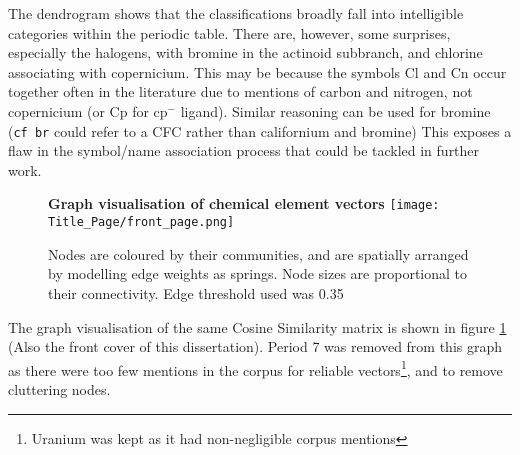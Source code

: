 The dendrogram shows that the classifications broadly fall into intelligible categories within the periodic table. There are, however, some surprises, especially the halogens, with bromine in  the actinoid subbranch, and chlorine associating with copernicium. This may be because the symbols Cl and Cn occur together often in the literature due to mentions of carbon and nitrogen, not copernicium (or Cp for cp$^{-}$ ligand). Similar reasoning can be used for bromine (\texttt{cf br} could refer to a CFC rather than californium and bromine) This exposes a flaw in the symbol/name association process that could be tackled in further work.

\newpage
\addtocounter{page}{1}
\begin{center}
\begin{figure}[H]
  \centering
  \textbf{Graph visualisation of chemical element vectors}
    \texttt{[image: Title\_Page/front\_page.png]}
    \caption[Graph Visualisation of Chemical Element Vectors]{Nodes are coloured by their communities, and are spatially arranged by modelling edge weights as springs. Node sizes are proportional to their connectivity. Edge threshold used was 0.35 }
    \label{fig:elems_graph}
\end{figure} 
\end{center}
\newpage
The graph visualisation of the same Cosine Similarity matrix is shown in figure \ref{fig:elems_graph} (Also the front cover of this dissertation). Period 7 was removed from this graph as there were too few mentions in the corpus for reliable vectors\footnote{Uranium was kept as it had non-negligible corpus mentions}, and to remove cluttering nodes.

